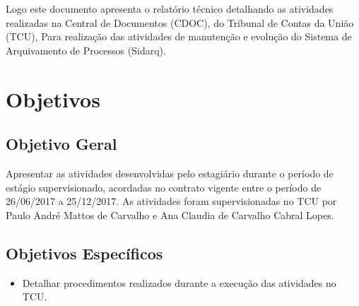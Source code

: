 Logo este documento apresenta o relatório técnico detalhando as atividades realizadas na Central de Documentos (CDOC), do Tribunal de Contas da União (TCU), Para realização das atividades de manutenção e evolução do Sistema de Arquivamento de Processos (Sidarq).

\section{Objetivos}

\subsection{Objetivo Geral}

Apresentar as atividades desenvolvidas pelo estagiário durante o período de estágio supervisionado, acordadas no contrato vigente entre o período de 26/06/2017 a 25/12/2017. As atividades foram supervisionadas no TCU por Paulo André Mattos de Carvalho e Ana Claudia de Carvalho Cabral Lopes.

\subsection{Objetivos Específicos}

\begin{itemize}
	\item Detalhar procedimentos realizados durante a execução das atividades no TCU.
\end{itemize}
